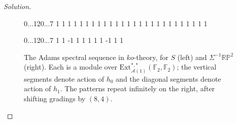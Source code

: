 \documentclass{amsart}
\def\RP{\mathbb{RP}}
\newcommand{\Ext}{\mathrm{Ext}}
\newcommand{\Steenrod}{\mathcal{A}}
\newcommand{\Aone}{\Steenrod(1)}
\newcommand{\FF}{\mathbb{F}}
\begin{document}
\begin{proof}[Solution]
\begin{figure}
  \centering
\begin{sseq}[entrysize=5mm, gridstroke=.05pt]{0...12}{0...7}
\ssdropbull
{}
 1
\ssdropbull \ssstroke
{}
 1
\ssdropbull \ssstroke
{} 1
\ssdropbull \ssstroke
{} 1
\ssdropbull \ssstroke
{} 1
\ssdropbull \ssstroke
{} 1
\ssdropbull \ssstroke
{} 1
\ssdropbull \ssstroke
{} 1
\ssdropbull \ssstroke
{} 1
\ssdropbull \ssstroke
{}
\ssdropbull \ssstroke
{}
\ssdropbull
{}
 1 
\ssdropbull \ssstroke
{} 1
\ssdropbull
{}
 1
\ssdropbull \ssstroke
{} 1
\ssdropbull \ssstroke
{} 1
\ssdropbull \ssstroke
{} 1
\ssdropbull \ssstroke
{} 1
\ssdropbull \ssstroke
{}
\ssdropbull \ssstroke
{}
 1
\ssdropbull
{}
 1
\ssdropbull \ssstroke
 1
\ssdropbull \ssstroke
{} 1
\ssdropbull \ssstroke
{} 1
\ssdropbull \ssstroke
{} 1
\ssdropbull \ssstroke
{}
\ssdropbull
 1 
\ssdropbull \ssstroke
{} 1
\ssdropbull
 1
\ssdropbull \ssstroke
{} 1
\ssdropbull \ssstroke
\end{sseq}\qquad
\begin{sseq}[entrysize=5mm, gridstroke=.05pt]{0...12}{0...7}
  \ssdropbull
{} 1
\ssdropbull \ssstroke
{} 1
\ssdropbull \ssstroke
{} {-1}
\ssdropbull \ssstroke
{} 1
\ssdropbull \ssstroke
{} 1
\ssdropbull \ssstroke
{} 1
\ssdropbull
{} 1
\ssdropbull \ssstroke
{} 1
\ssdropbull \ssstroke
{} {-1}
\ssdropbull \ssstroke
{} 1
\ssdropbull \ssstroke
{} 1
\ssdropbull \ssstroke
\end{sseq}
\caption{The Adams spectral sequence in $ko$-theory, for $S$ (left) and $\Sigma^{-1}\RP^2$ (right). Each is a module over $\Ext^{*,*}_{\Aone}(\FF_2,\FF_2)$; the vertical segments denote action of $h_0$ and the diagonal segments denote action of $h_1$. The patterns repeat infinitely on the right, after shifting gradings by $(8,4)$.}
\label{fig:spectralS}
\end{figure}



\end{proof}
\end{document}
